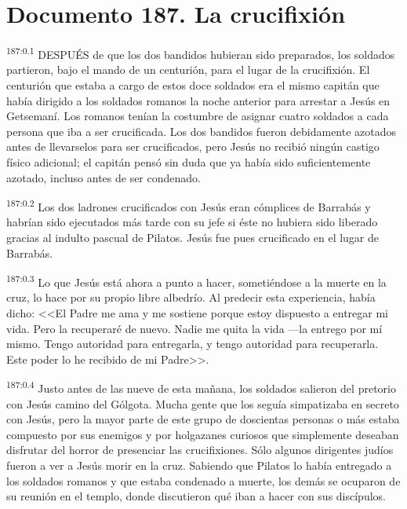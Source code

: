 \chapter{Documento 187. La crucifixión}
\par 
\textsuperscript{187:0.1} DESPUÉS de que los dos bandidos hubieran sido preparados, los soldados partieron, bajo el mando de un centurión, para el lugar de la crucifixión. El centurión que estaba a cargo de estos doce soldados era el mismo capitán que había dirigido a los soldados romanos la noche anterior para arrestar a Jesús en Getsemaní. Los romanos tenían la costumbre de asignar cuatro soldados a cada persona que iba a ser crucificada. Los dos bandidos fueron debidamente azotados antes de llevarselos para ser crucificados, pero Jesús no recibió ningún castigo físico adicional; el capitán pensó sin duda que ya había sido suficientemente azotado, incluso antes de ser condenado.

\par 
\textsuperscript{187:0.2} Los dos ladrones crucificados con Jesús eran cómplices de Barrabás y habrían sido ejecutados más tarde con su jefe si éste no hubiera sido liberado gracias al indulto pascual de Pilatos. Jesús fue pues crucificado en el lugar de Barrabás.

\par 
\textsuperscript{187:0.3} Lo que Jesús está ahora a punto a hacer, sometiéndose a la muerte en la cruz, lo hace por su propio libre albedrío. Al predecir esta experiencia, había dicho: <<El Padre me ama y me sostiene porque estoy dispuesto a entregar mi vida. Pero la recuperaré de nuevo. Nadie me quita la vida ---la entrego por mí mismo. Tengo autoridad para entregarla, y tengo autoridad para recuperarla. Este poder lo he recibido de mi Padre>>.

\par 
\textsuperscript{187:0.4} Justo antes de las nueve de esta mañana, los soldados salieron del pretorio con Jesús camino del Gólgota. Mucha gente que los seguía simpatizaba en secreto con Jesús, pero la mayor parte de este grupo de doscientas personas o más estaba compuesto por sus enemigos y por holgazanes curiosos que simplemente deseaban disfrutar del horror de presenciar las crucifixiones. Sólo algunos dirigentes judíos fueron a ver a Jesús morir en la cruz. Sabiendo que Pilatos lo había entregado a los soldados romanos y que estaba condenado a muerte, los demás se ocuparon de su reunión en el templo, donde discutieron qué iban a hacer con sus discípulos.

